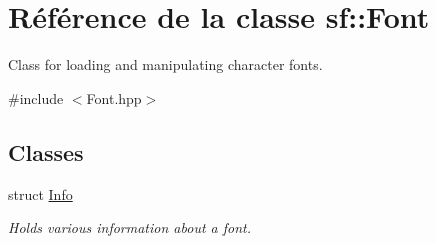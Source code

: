 \hypertarget{classsf_1_1Font}{}\section{Référence de la classe sf\+:\+:Font}
\label{classsf_1_1Font}


Class for loading and manipulating character fonts.  




{\ttfamily \#include $<$Font.\+hpp$>$}

\subsection*{Classes}
\begin{DoxyCompactItemize}
\item 
struct \hyperlink{structsf_1_1Font_1_1Info}{Info}
\begin{DoxyCompactList}\small\item\em Holds various information about a font. \end{DoxyCompactList}\end{DoxyCompactItemize}
